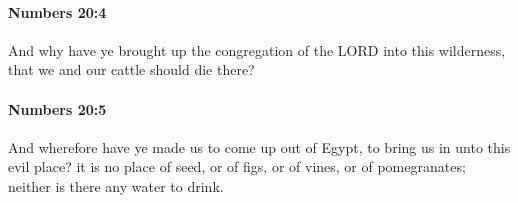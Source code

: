 		\paragraph{Numbers 20:4} %
			\label{NUMBERS-20-4}

			And why have ye brought up the congregation of the LORD into this wilderness, that we and our cattle should die there?


		\paragraph{Numbers 20:5} %
			\label{NUMBERS-20-5}

			And wherefore have ye made us to come up out of Egypt, to bring us in unto this evil place? it is no place of seed, or of figs, or of vines, or of pomegranates; neither is there any water to drink.


